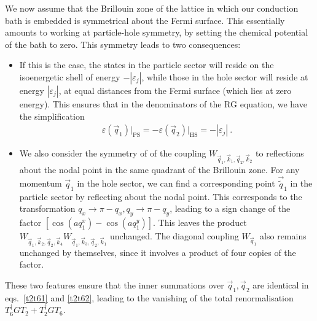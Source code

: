 \documentclass{revtex4-2}
\begin{document}
We now assume that the Brillouin zone of the lattice in which our conduction bath is embedded is symmetrical about the Fermi surface. This essentially amounts to working at particle-hole symmetry, by setting the chemical potential of the bath to zero. This symmetry leads to two consequences:
\begin{itemize}
	\item If this is the case, the states in the particle sector will reside on the isoenergetic shell of energy \(-|\varepsilon_j|\), while those in the hole sector will reside at energy \(|\varepsilon_j|\), at equal distances from the Fermi surface (which lies at zero energy). This ensures that in the denominators of the RG equation, we have the simplification 
\begin{equation}\begin{aligned}
	\varepsilon(\vec q_1)\bigg|_\text{PS} = -\varepsilon(\vec q_2)\bigg|_\text{HS} = -|\varepsilon_j|~.
\end{aligned}\end{equation}
\item We also consider the symmetry of of the coupling \(W_{\vec q_1,\vec k_1, \vec q_2, \vec k_2}\) to reflections about the nodal point in the same quadrant of the Brillouin zone. For any momentum \(\vec q_1\) in the hole sector, we can find a corresponding point \(\vec \tilde q_1\) in the particle sector by reflecting about the nodal point. This corresponds to the transformation \(q_x \to \pi - q_x, q_y \to \pi - q_y\), leading to a sign change of the factor \(\left[\cos\left( aq_1^x \right) - \cos\left( aq_1^y \right) \right]\). This leaves the product \(W_{\vec q_1,\vec k_2, \vec q_2, \vec k_4} W_{\vec q_1,\vec k_3, \vec q_2, \vec k_1}\) unchanged. The diagonal coupling \(W_{\vec q_1}\) also remains unchanged by themselves, since it involves a product of four copies of the factor.
\end{itemize}
These two features ensure that the inner summations over \(\vec q_1,\vec q_2\) are identical in eqs.~\ref{t2t61} and \ref{t2t62}, leading to the vanishing of the total renormalisation \(T_6^\dagger G T_2 + T_2^\dagger G T_6\).
\end{document}
